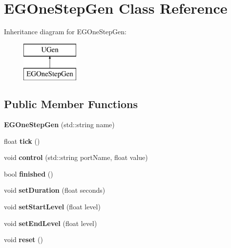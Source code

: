 \hypertarget{classEGOneStepGen}{}\section{E\+G\+One\+Step\+Gen Class Reference}
\label{classEGOneStepGen}
Inheritance diagram for E\+G\+One\+Step\+Gen\+:\begin{figure}[H]
\begin{center}
\leavevmode
\includegraphics[height=2.000000cm]{classEGOneStepGen}
\end{center}
\end{figure}
\subsection*{Public Member Functions}
\begin{DoxyCompactItemize}
\item 
{\bfseries E\+G\+One\+Step\+Gen} (std\+::string name)\hypertarget{classEGOneStepGen_a9bc697acabed6c7b0467369ba073ede1}{}\label{classEGOneStepGen_a9bc697acabed6c7b0467369ba073ede1}

\item 
float {\bfseries tick} ()\hypertarget{classEGOneStepGen_a74df96649d7a66d19cb33bf9bf13f54a}{}\label{classEGOneStepGen_a74df96649d7a66d19cb33bf9bf13f54a}

\item 
void {\bfseries control} (std\+::string port\+Name, float value)\hypertarget{classEGOneStepGen_a8979594fb226c732a9b8232664f09047}{}\label{classEGOneStepGen_a8979594fb226c732a9b8232664f09047}

\item 
bool {\bfseries finished} ()\hypertarget{classEGOneStepGen_ae9f187e0f266559a80e4f4b534d79f78}{}\label{classEGOneStepGen_ae9f187e0f266559a80e4f4b534d79f78}

\item 
void {\bfseries set\+Duration} (float seconds)\hypertarget{classEGOneStepGen_aaf02138e168cad06cb955944f57ce93c}{}\label{classEGOneStepGen_aaf02138e168cad06cb955944f57ce93c}

\item 
void {\bfseries set\+Start\+Level} (float level)\hypertarget{classEGOneStepGen_af2b5bd8522fac9dc997d78d3750cdbbb}{}\label{classEGOneStepGen_af2b5bd8522fac9dc997d78d3750cdbbb}

\item 
void {\bfseries set\+End\+Level} (float level)\hypertarget{classEGOneStepGen_a3d58403aa5bebffeaf3f326855e0a233}{}\label{classEGOneStepGen_a3d58403aa5bebffeaf3f326855e0a233}

\item 
void {\bfseries reset} ()\hypertarget{classEGOneStepGen_a4898b08a0687e03802abdb7945708cab}{}\label{classEGOneStepGen_a4898b08a0687e03802abdb7945708cab}

\end{DoxyCompactItemize}
